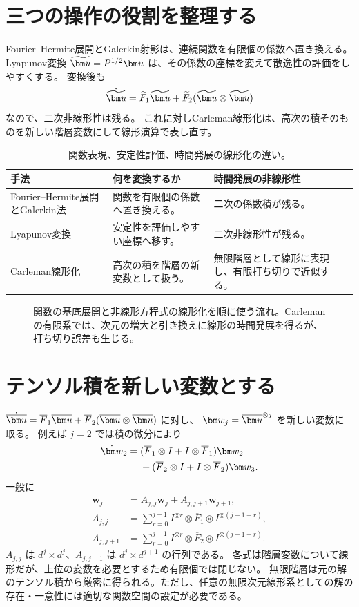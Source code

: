 \section{三つの操作の役割を整理する}
Fourier--Hermite展開とGalerkin射影は、連続関数を有限個の係数へ置き換える。
Lyapunov変換 $\tu=P^{1/2}\uu$ は、その係数の座標を変えて散逸性の評価をしやすくする。
変換後も
\[
\dot\tu=\widetilde F_1\tu+\widetilde F_2(\tu\otimes\tu)
\]
なので、二次非線形性は残る。
これに対しCarleman線形化は、高次の積そのものを新しい階層変数にして線形演算で表し直す。

\begin{table}[htbp]
\centering\small
\caption{関数表現、安定性評価、時間発展の線形化の違い。}
\begin{tabularx}{\textwidth}{lXX}
\toprule 手法 & 何を変換するか & 時間発展の非線形性 \\\midrule
Fourier--Hermite展開とGalerkin法 & 関数を有限個の係数へ置き換える。 & 二次の係数積が残る。\\
Lyapunov変換 & 安定性を評価しやすい座標へ移す。 & 二次非線形性が残る。\\
Carleman線形化 & 高次の積を階層の新変数として扱う。 & 無限階層として線形に表現し、有限打ち切りで近似する。\\
\bottomrule
\end{tabularx}
\end{table}

\begin{figure}[htbp]
\centering

\caption{関数の基底展開と非線形方程式の線形化を順に使う流れ。Carlemanの有限系では、次元の増大と引き換えに線形の時間発展を得るが、打ち切り誤差も生じる。}
\label{fig:representation-vs-linearization}
\end{figure}

\section{テンソル積を新しい変数とする}
$\dot\bu=\overline F_1\bu+\overline F_2(\bu\otimes\bu)$ に対し、
$\bm w_j=\bu^{\otimes j}$ を新しい変数に取る。
例えば $j=2$ では積の微分により
\begin{align}
\dot{\bm w}_2={}&(\overline F_1\otimes I+I\otimes\overline F_1)\bm w_2\notag\\
&+(\overline F_2\otimes I+I\otimes\overline F_2)\bm w_3.
\end{align}
一般に
\begin{align}
\dot{\bm w}_j&=A_{j,j}\bm w_j+A_{j,j+1}\bm w_{j+1},\\
A_{j,j}&=\sum_{r=0}^{j-1}I^{\otimes r}\otimes\overline F_1\otimes I^{\otimes(j-1-r)},\\
A_{j,j+1}&=\sum_{r=0}^{j-1}I^{\otimes r}\otimes\overline F_2\otimes I^{\otimes(j-1-r)}.
\label{eq:carlemanblocks}
\end{align}
$A_{j,j}$ は $d^j\times d^j$、$A_{j,j+1}$ は $d^j\times d^{j+1}$ の行列である。
各式は階層変数について線形だが、上位の変数を必要とするため有限個では閉じない。
無限階層は元の解のテンソル積から厳密に得られる。ただし、任意の無限次元線形系としての解の存在・一意性には適切な関数空間の設定が必要である。

